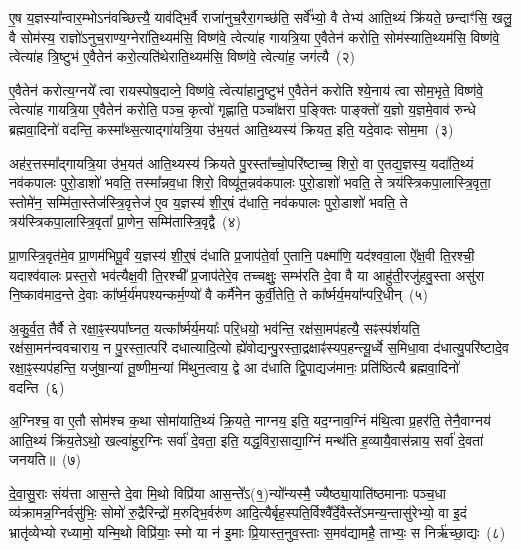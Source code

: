 ए॒ष य॒ज्ञस्या᳚न्वार॒म्भो\-ऽन॑वच्छित्त्यै॒ याव॑द्भि॒र्वै राजा॑नुच॒रैरा॒गच्छ॑ति॒ सर्वे᳚भ्यो॒ वै तेभ्य॑ आति॒थ्यं क्रि॑यते॒ छन्दाꣳ॑सि॒ खलु॒ वै सोम॑स्य॒ राज्ञो॑\-ऽनुच॒राण्य॒ग्नेरा॑ति॒थ्यम॑सि॒ विष्ण॑वे॒ त्वेत्या॑ह गायत्रि॒या ए॒वैतेन॑ करोति॒ सोम॑स्याति॒थ्यम॑सि॒ विष्ण॑वे॒ त्वेत्या॑ह त्रि॒ष्टुभ॑ ए॒वैतेन॑ करो॒त्यति॑थेराति॒थ्यम॑सि॒ विष्ण॑वे॒ त्वेत्या॑ह॒ जग॑त्यै~(२)

ए॒वैतेन॑ करोत्य॒ग्नये᳚ त्वा रायस्पोष॒दाव्ने॒ विष्ण॑वे॒ त्वेत्या॑हानु॒ष्टुभ॑ ए॒वैतेन॑ करोति श्ये॒नाय॑ त्वा सोम॒भृते॒ विष्ण॑वे॒ त्वेत्या॑ह गायत्रि॒या ए॒वैतेन॑ करोति॒ पञ्च॒ कृत्वो॑ गृह्णाति॒ पञ्चा᳚क्षरा प॒ङ्क्तिः पाङ्क्तो॑ य॒ज्ञो य॒ज्ञमे॒वाव॑ रुन्धे ब्रह्मवा॒दिनो॑ वदन्ति॒ कस्मा᳚थ्स॒त्याद्गा॑यत्रि॒या उ॑भ॒यत॑ आति॒थ्यस्य॑ क्रियत॒ इति॒ यदे॒वादः सोम॒मा~(३)

अह॑र॒त्तस्मा᳚द्गायत्रि॒या उ॑भ॒यत॑ आति॒थ्यस्य॑ क्रियते पु॒रस्ता᳚च्चो॒परि॑ष्टाच्च॒ शिरो॒ वा ए॒तद्य॒ज्ञस्य॒ यदा॑ति॒थ्यं नव॑कपालः पुरो॒डाशो॑ भवति॒ तस्मा᳚न्नव॒धा शिरो॒ विष्यू॑त॒न्नव॑कपालः पुरो॒डाशो॑ भवति॒ ते त्रय॑स्त्रिकपा॒लास्त्रि॒वृता॒ स्तोमे॑न॒ सम्मि॑ता॒स्तेज॑स्त्रि॒वृत्तेज॑ ए॒व य॒ज्ञस्य॑ शी॒र्॒\mbox{}षं द॑धाति॒ नव॑कपालः पुरो॒डाशो॑ भवति॒ ते त्रय॑स्त्रिकपा॒लास्त्रि॒वृता᳚ प्रा॒णेन॒ सम्मि॑तास्त्रि॒वृद्वै~(४)

प्रा॒णस्त्रि॒वृत॑मे॒व प्रा॒णम॑भिपू॒र्वं य॒ज्ञस्य॑ शी॒र्॒\mbox{}षं द॑धाति प्र॒जा\-प॑ते॒र्वा ए॒तानि॒ पक्ष्मा॑णि॒ यद॑श्ववा॒ला ऐ᳚क्ष॒वी ति॒रश्ची॒ यदाश्व॑वालः प्रस्त॒रो भव॑त्यैक्ष॒वी ति॒रश्ची᳚ प्र॒जा\-प॑तेरे॒व तच्चक्षुः॒ सम्भ॑रति दे॒वा वै या आहु॑ती॒रजु॑हवु॒स्ता असु॑रा नि॒ष्काव॑माद॒न्ते दे॒वाः का᳚र्\mbox{}ष्म॒र्य॑मपश्यन्कर्म॒ण्यो॑ वै कर्मै॑नेन कुर्वी॒तेति॒ ते का᳚र्ष्मर्य॒मया᳚न्परि॒धीन्~(५)

अ॒कु॒र्व॒त॒ तैर्वै ते रक्षा॒ꣴ॒स्यपा᳚घ्नत॒ यत्का᳚र्ष्मर्य॒मयाः᳚ परि॒धयो॒ भव॑न्ति॒ रक्ष॑सा॒मप॑हत्यै॒ सꣴस्प॑र्\mbox{}शयति॒ रक्ष॑सा॒मन॑न्ववचाराय॒ न पु॒रस्ता॒त्परि॑ दधात्यादि॒त्यो ह्ये॑वोद्यन्पु॒रस्ता॒द्रक्षाꣴ॑स्यप॒हन्त्यू॒र्ध्वे स॒मिधा॒वा द॑धात्यु॒परि॑ष्टादे॒व रक्षा॒ꣴ॒स्यप॑हन्ति॒ यजु॑षा॒न्यां तू॒ष्णीम॒न्यां मि॑थुन॒त्वाय॒ द्वे आ द॑धाति द्वि॒पाद्यज॑मानः॒ प्रति॑ष्ठित्यै ब्रह्मवा॒दिनो॑ वदन्ति~(६)

अ॒ग्निश्च॒ वा ए॒तौ सोम॑श्च क॒था सोमा॑याति॒थ्यं क्रि॒यते॒ नाग्नय॒ इति॒ यद॒ग्नाव॒ग्निं म॑थि॒त्वा प्र॒हर॑ति॒ तेनै॒वाग्नय॑ आति॒थ्यं क्रि॑य॒ते\-ऽथो॒ खल्वा॑हुर॒ग्निः सर्वा॑ दे॒वता॒ इति॒ यद्ध॒विरा॒साद्या॒ग्निं मन्थ॑ति ह॒व्यायै॒वास॑न्नाय॒ सर्वा॑ दे॒वता॑ जनयति॥~(७)

{\anuvakamend[{पत्नि॑या ए॒व जग॑त्या॒ आ त्रि॒वृद्वै प॑रि॒धीन् व॑द॒न्त्येक॑चत्वारिꣳशच्च}]}%

दे॒वा॒सु॒राः संय॑त्ता आस॒न्ते दे॒वा मि॒थो विप्रि॑या आस॒न्ते᳚\-ऽ(१॒)न्यो᳚न्यस्मै॒ ज्यैष्ठ्या॒याति॑ष्ठमानाः पञ्च॒धा व्य॑क्रामन्न॒ग्नि\-र्वसु॑भिः॒ सोमो॑ रु॒द्रैरिन्द्रो॑ म॒रुद्भि॒र्वरु॑ण आदि॒त्यैर्बृह॒स्पति॒र्विश्वै᳚र्दे॒वैस्ते॑\-ऽमन्य॒न्तासु॑रेभ्यो॒ वा इ॒दं भ्रातृ॑व्येभ्यो रध्यामो॒ यन्मि॒थो विप्रि॑याः॒ स्मो या न॑ इ॒माः प्रि॒यास्त॒नुव॒स्ताः स॒मव॑द्यामहै॒ ताभ्यः॒ स निर्\mbox{}ऋ॑च्छा॒द्यः~(८)

